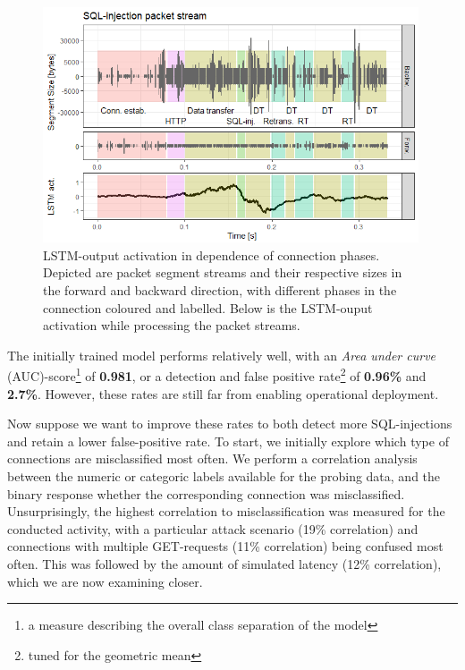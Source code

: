 \documentclass[runningheads]{llncs}
\begin{document}
\begin{figure}
\centering
\includegraphics[width=0.99\textwidth]{images/LSTM_activation.png}
\caption{LSTM-output activation in dependence of connection phases. Depicted are packet segment streams and their respective sizes in the forward and backward direction, with different phases in the connection coloured and labelled. Below is the LSTM-ouput activation while processing the packet streams.}\label{fig:LSTM_act}
\end{figure}

The initially trained model performs relatively well, with an \textit{Area under curve} (AUC)-score\footnote{a measure describing the overall class separation of the model} of \textbf{0.981}, or a detection and false positive rate\footnote{tuned for the geometric mean} of \textbf{0.96\%} and \textbf{2.7\%}. However, these rates are still far from enabling operational deployment. 

Now suppose we want to improve these rates to both detect more SQL-injections and retain a lower false-positive rate. To start, we initially explore which type of connections are misclassified most often. We perform a correlation analysis between the numeric or categoric labels available for the probing data, and the binary response whether the corresponding connection was misclassified. Unsurprisingly, the highest correlation to misclassification was measured for the conducted activity, with a particular attack scenario (19\% correlation) and connections with multiple GET-requests (11\% correlation) being confused most often. This was followed by the amount of simulated latency (12\% correlation), which we are now examining closer.
\end{document}
